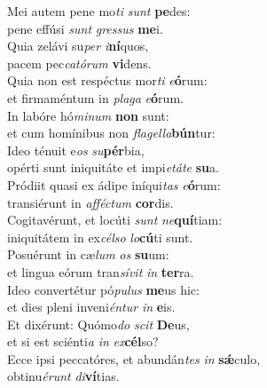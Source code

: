 \evenverse Mei autem pene mo\textit{ti} \textit{sunt} \textbf{pe}des:~\*\\
\evenverse pene effúsi \textit{sunt} \textit{gres}\textit{sus} \textbf{me}i.\\
\oddverse Quia zelávi su\textit{per} \textit{i}\textbf{ní}quos,~\*\\
\oddverse pacem pec\textit{ca}\textit{tó}\textit{rum} \textbf{vi}dens.\\
\evenverse Quia non est respéctus mor\textit{ti} \textit{e}\textbf{ó}rum:~\*\\
\evenverse et firmaméntum in \textit{pla}\textit{ga} \textit{e}\textbf{ó}rum.\\
\oddverse In labóre hó\textit{mi}\textit{num} \textbf{non} sunt:~\*\\
\oddverse et cum homínibus non \textit{fla}\textit{gel}\textit{la}\textbf{bún}tur:\\
\evenverse Ideo ténuit e\textit{os} \textit{su}\textbf{pér}bia,~\*\\
\evenverse opérti sunt iniquitáte et impi\textit{e}\textit{tá}\textit{te} \textbf{su}a.\\
\oddverse Pródiit quasi ex ádipe iníqui\textit{tas} \textit{e}\textbf{ó}rum:~\*\\
\oddverse transiérunt in \textit{af}\textit{fé}\textit{ctum} \textbf{cor}dis.\\
\evenverse Cogitavérunt, et locúti \textit{sunt} \textit{ne}\textbf{quí}tiam:~\*\\
\evenverse iniquitátem in ex\textit{cél}\textit{so} \textit{lo}\textbf{cú}ti sunt.\\
\oddverse Posuérunt in cæ\textit{lum} \textit{os} \textbf{su}um:~\*\\
\oddverse et lingua eórum tran\textit{sí}\textit{vit} \textit{in} \textbf{ter}ra.\\
\evenverse Ideo convertétur pó\textit{pu}\textit{lus} \textbf{me}us hic:~\*\\
\evenverse et dies pleni inveni\textit{én}\textit{tur} \textit{in} \textbf{e}is.\\
\oddverse Et dixérunt: Quómo\textit{do} \textit{scit} \textbf{De}us,~\*\\
\oddverse et si est sciénti\textit{a} \textit{in} \textit{ex}\textbf{cél}so?\\
\evenverse Ecce ipsi peccatóres, et abundán\textit{tes} \textit{in} \textbf{sǽ}culo,~\*\\
\evenverse obtinu\textit{é}\textit{runt} \textit{di}\textbf{ví}tias.\\
